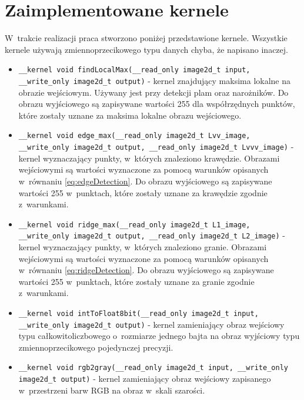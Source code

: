 \chapter{Zaimplementowane kernele}
\label{cha:kernele}

W~trakcie realizacji praca stworzono poniżej przedstawione kernele. Wszystkie kernele używają zmiennoprzecikowego typu danych chyba, że napisano inaczej.

\begin{itemize}
\item 
\texttt{\_\_kernel void findLocalMax(\_\_read\_only image2d\_t input, \_\_write\_only image2d\_t output)} - kernel znajdujący maksima lokalne na obrazie wejściowym. Używany jest przy detekcji plam oraz narożników. Do obrazu wyjściowego są zapisywane wartości 255 dla współrzędnych punktów, które zostały uznane za maksima lokalne obrazu wejściowego.

\item 
\texttt{\_\_kernel void  edge\_max(\_\_read\_only image2d\_t Lvv\_image, \_\_write\_only image2d\_t output, \_\_read\_only image2d\_t Lvvv\_image)} - kernel wyznaczający punkty, w~których znaleziono krawędzie. Obrazami wejściowymi są wartości wyznaczone za pomocą warunków opisanych w~równaniu \eqref{eq:edgeDetection}. Do obrazu wyjściowego są zapisywane wartości 255 w~punktach, które zostały uznane za krawędzie zgodnie z~warunkami.

\item 
\texttt{\_\_kernel void  ridge\_max(\_\_read\_only image2d\_t L1\_image, \_\_write\_only image2d\_t output, \_\_read\_only image2d\_t L2\_image)} - kernel wyznaczający punkty, w~których znaleziono granie. Obrazami wejściowymi są wartości wyznaczone za pomocą warunków opisanych w~równaniu \eqref{eq:ridgeDetection}. Do obrazu wyjściowego są zapisywane wartości 255 w~punktach, które zostały uznane za granie zgodnie z~warunkami.

\item 
\texttt{\_\_kernel void  intToFloat8bit(\_\_read\_only image2d\_t input, \_\_write\_only image2d\_t output)} - kernel zamieniający obraz wejściowy typu całkowitoliczbowego o~rozmiarze jednego bajta na obraz wyjściowy typu zmiennoprzecikowego pojedynczej precyzji.

\item 
\texttt{\_\_kernel void rgb2gray(\_\_read\_only image2d\_t input, \_\_write\_only image2d\_t output)} - kernel zamieniający obraz wejściowy zapisanego w~przestrzeni barw RGB na obraz w~skali szarości.


\end{itemize}
